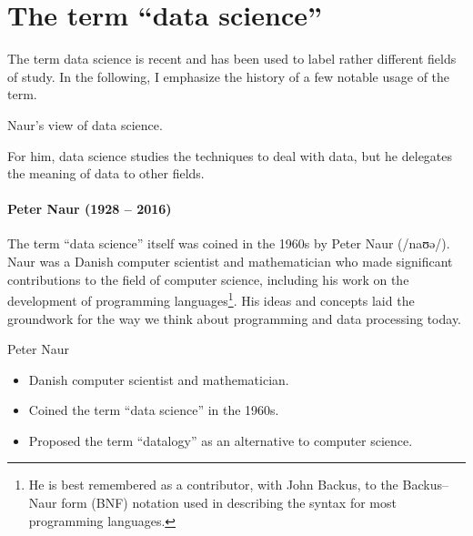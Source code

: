 \section{The term ``data science''}

The term data science is recent and has been used to label rather different fields of
study.  In the following, I emphasize the history of a few notable usage of the term.

\def\naurds{(0,0) circle (20mm)}
\def\naurcs{(0:5mm) circle (15mm)}
\def\naurde{(0:40mm) circle (15mm)}



\begin{figurebox}[label=fig:naur]{Naur's view of data science.}
  \centering
  \tcblower
    For him, data science studies the techniques to deal
    with data, but he delegates the meaning of data to other fields.
\end{figurebox}

\paragraph{Peter Naur (1928 -- 2016)}

The term ``data science'' itself was coined in the 1960s by Peter Naur (/naʊə/). Naur was
a Danish computer scientist and mathematician who made significant contributions to the
field of computer science, including his work on the development of programming
languages\footnote{He is best remembered as a contributor, with John Backus, to the
Backus–Naur form (BNF) notation used in describing the syntax for most programming
languages.}.
His ideas and concepts laid the groundwork for the way we think about programming and data
processing today.

\begin{slidebox}{Peter Naur}{}
  \begin{itemize}
    \item Danish computer scientist and mathematician.
    \item Coined the term ``data science'' in the 1960s.
    \item Proposed the term ``datalogy'' as an alternative to computer science.
  \end{itemize}
\end{slidebox}

